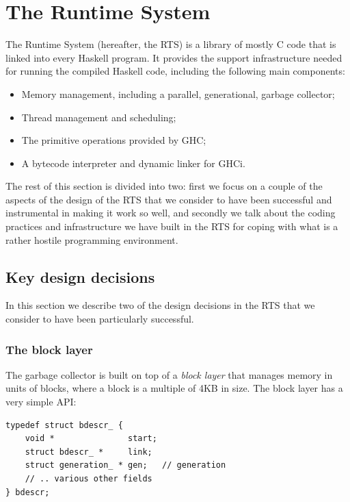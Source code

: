 \documentclass{article}
\begin{document}
{%
\section{The Runtime System}
\label{s:rts}

The Runtime System (hereafter, the RTS) is a library of mostly C code
that is linked into every Haskell program.  It provides the support
infrastructure needed for running the compiled Haskell code, including
the following main components:

\begin{itemize}
\item Memory management, including a parallel, generational, garbage collector;
\item Thread management and scheduling;
\item The primitive operations provided by GHC;
\item A bytecode interpreter and dynamic linker for GHCi.
\end{itemize}

The rest of this section is divided into two: first we focus on a
couple of the aspects of the design of the RTS that we consider to
have been successful and instrumental in making it work so well, and
secondly we talk about the coding practices and infrastructure we have
built in the RTS for coping with what is a rather hostile programming
environment.

\subsection{Key design decisions}

In this section we describe two of the design decisions in the RTS
that we consider to have been particularly successful.

\subsubsection{The block layer}

The garbage collector is built on top of a \emph{block layer} that
manages memory in units of blocks, where a block is a multiple of 4KB
in size.  The block layer has a very simple API:

\begin{verbatim}
typedef struct bdescr_ {
    void *               start;
    struct bdescr_ *     link;
    struct generation_ * gen;   // generation
    // .. various other fields
} bdescr;


\end{verbatim}}
\end{document}
